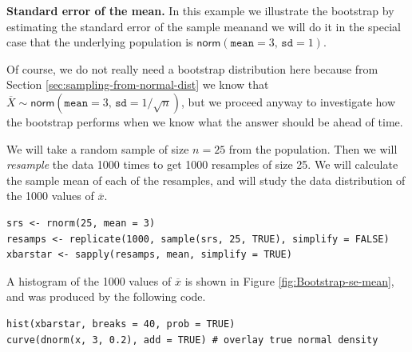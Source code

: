 \documentclass[captions=tableheading]{scrbook}
\begin{document}
\begin{example}
\label{exa:Bootstrap-se-mean}

\textbf{Standard error of the mean.}  In this example we illustrate the bootstrap by estimating the standard error of the sample meanand we will do it in the special case that the underlying population is \(\mathsf{norm}(\mathtt{mean}=3,\,\mathtt{sd}=1)\).  

Of course, we do not really need a bootstrap distribution here because from Section \ref{sec:sampling-from-normal-dist} we know that \(\overline{X}\sim\mathsf{norm}(\mathtt{mean}=3,\,\mathtt{sd}=1/\sqrt{n})\), but we proceed anyway to investigate how the bootstrap performs when we know what the answer should be ahead of time.

We will take a random sample of size \(n=25\) from the population. Then we will \emph{resample} the data 1000 times to get 1000 resamples of size 25. We will calculate the sample mean of each of the resamples, and will study the data distribution of the 1000 values of \(\overline{x}\).


\begin{verbatim}
srs <- rnorm(25, mean = 3)
resamps <- replicate(1000, sample(srs, 25, TRUE), simplify = FALSE)
xbarstar <- sapply(resamps, mean, simplify = TRUE)
\end{verbatim}

A histogram of the 1000 values of \(\overline{x}\) is shown in Figure \ref{fig:Bootstrap-se-mean}, and was produced by the following code.


\begin{verbatim}
hist(xbarstar, breaks = 40, prob = TRUE)
curve(dnorm(x, 3, 0.2), add = TRUE) # overlay true normal density
\end{verbatim}




\end{example}
\end{document}
